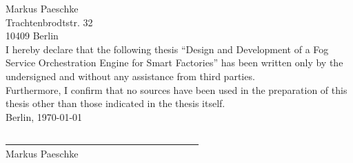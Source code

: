\text{ }
\vspace{13.5cm}


Markus Paeschke\\
Trachtenbrodtstr. 32\\
10409 Berlin\\

I hereby declare that the following thesis ``Design and Development of a Fog Service Orchestration Engine for Smart Factories'' has been written only by the undersigned and without any assistance from third parties.\\

Furthermore, I confirm that no sources have been used in the preparation of this thesis other than those indicated in the thesis itself.\\

Berlin, \today\\
\medskip
\medskip

\medskip
\underline{~~~~~~~~~~~~~~~~~~~~~~~~~~~~~~~~~~~~~~~~}\\
Markus Paeschke\\
